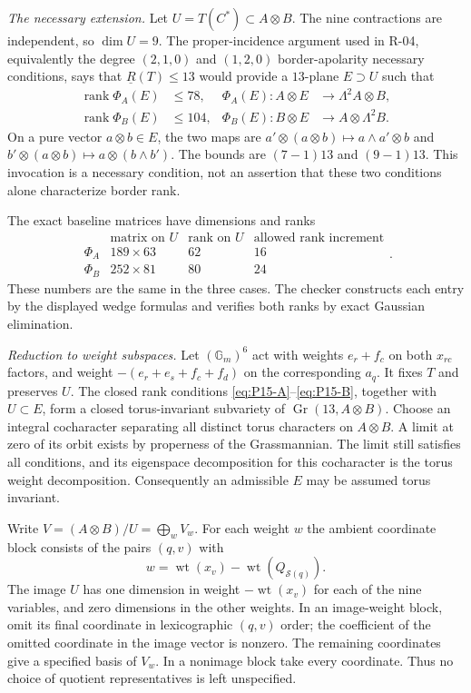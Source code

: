 \emph{The necessary extension.}
Let $U=T(C^*)\subset A\otimes B$.  The nine contractions are independent,
so $\dim U=9$.  The proper-incidence argument used in R-04, equivalently
the degree $(2,1,0)$ and $(1,2,0)$ border-apolarity necessary conditions,
says that $\underline R(T)\le13$ would provide a $13$-plane
$E\supset U$ such that
\begin{align}
 \operatorname{rank}\Phi_A(E)&\le78,&
 \Phi_A(E):A\otimes E&\longrightarrow\Lambda^2A\otimes B,\label{eq:P15-A}\\
 \operatorname{rank}\Phi_B(E)&\le104,&
 \Phi_B(E):B\otimes E&\longrightarrow A\otimes\Lambda^2B.\label{eq:P15-B}
\end{align}
On a pure vector $a\otimes b\in E$, the two maps are
$a'\otimes(a\otimes b)\mapsto a\wedge a'\otimes b$ and
$b'\otimes(a\otimes b)\mapsto a\otimes(b\wedge b')$.
The bounds are $(7-1)13$ and $(9-1)13$.
This invocation is a necessary condition, not an assertion that these two
conditions alone characterize border rank.

The exact baseline matrices have dimensions and ranks
\[
\begin{array}{c|c|c|c}
 &\text{matrix on }U&\text{rank on }U&\text{allowed rank increment}\\\hline
 \Phi_A&189\times63&62&16\\
 \Phi_B&252\times81&80&24
\end{array}.
\]
These numbers are the same in the three cases.  The checker constructs
each entry by the displayed wedge formulas and verifies both ranks by
exact Gaussian elimination.

\emph{Reduction to weight subspaces.}
Let $(\mathbb G_m)^6$ act with weights $e_r+f_c$ on both $x_{rc}$ factors,
and weight $-(e_r+e_s+f_c+f_d)$ on the corresponding $a_q$.
It fixes $T$ and preserves $U$.  The closed rank conditions
\eqref{eq:P15-A}--\eqref{eq:P15-B}, together with $U\subset E$, form a
closed torus-invariant subvariety of $\operatorname{Gr}(13,A\otimes B)$.
Choose an integral cocharacter separating all distinct torus characters
on $A\otimes B$.  A limit at zero of its orbit exists by properness of
the Grassmannian.  The limit still satisfies all conditions, and its
eigenspace decomposition for this cocharacter is the torus weight
decomposition.  Consequently an admissible $E$ may be assumed torus
invariant.

Write $V=(A\otimes B)/U=\bigoplus_wV_w$.  For each weight $w$ the
ambient coordinate block consists of the pairs $(q,v)$ with
\[
 w=\operatorname{wt}(x_v)-\operatorname{wt}(Q_{\mathcal S(q)}).
\]
The image $U$ has one dimension in weight $-\operatorname{wt}(x_v)$ for
each of the nine variables, and zero dimensions in the other weights.
In an image-weight block, omit its final coordinate in lexicographic
$(q,v)$ order; the coefficient of the omitted coordinate in the image
vector is nonzero.  The remaining coordinates give a specified basis of
$V_w$.  In a nonimage block take every coordinate.  Thus no choice of
quotient representatives is left unspecified.

